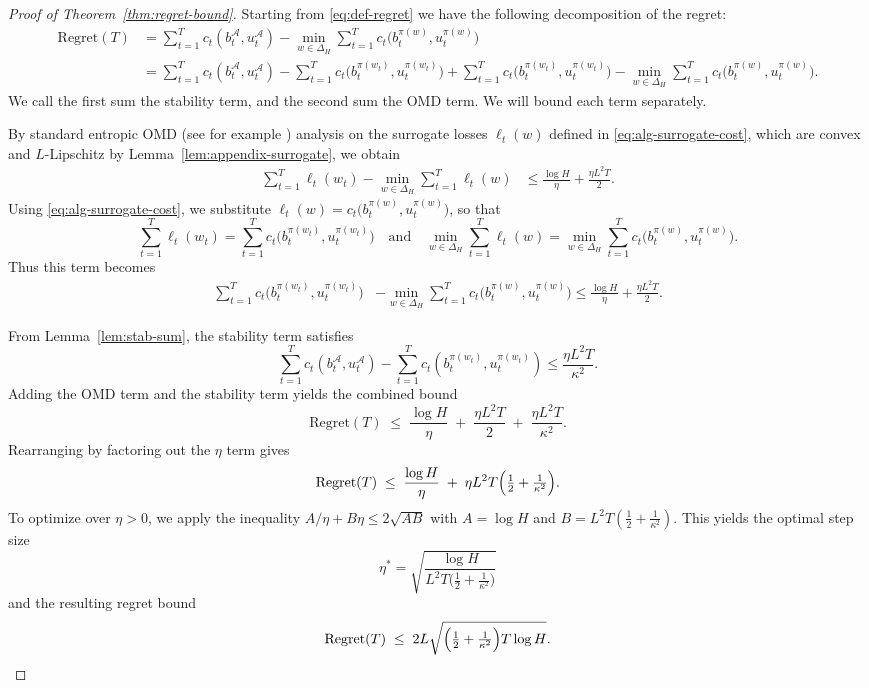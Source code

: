 \documentclass[11pt]{article}
\begin{document}
\begin{proof}[Proof of Theorem~\ref{thm:regret-bound}]

Starting from \eqref{eq:def-regret} we have the following decomposition of the regret:
\begin{align*}
\mathrm{Regret}(T)  &= \sum_{t=1}^T c_t(b_t^{\mathcal A},u_t^{\mathcal A}) - \min_{w\in\Delta_H}\sum_{t=1}^T c_t\bigl(b_t^{\pi(w)},u_t^{\pi(w)}\bigr) \\
&= \sum_{t=1}^T c_t(b_t^{\mathcal A},u_t^{\mathcal A}) - \sum_{t=1}^T c_t\bigl(b_t^{\pi(w_t)},u_t^{\pi(w_t)}\bigr) + \sum_{t=1}^T c_t\bigl(b_t^{\pi(w_t)},u_t^{\pi(w_t)}\bigr) - \min_{w\in\Delta_H}\sum_{t=1}^T c_t\bigl(b_t^{\pi(w)},u_t^{\pi(w)}\bigr).
\end{align*}
We call the first sum the stability term, and the second sum the OMD term. We will bound each term separately.

By standard entropic OMD (see for example \cite{hazan2016introduction}) analysis on the surrogate losses \(\ell_t(w)\) defined in \eqref{eq:alg-surrogate-cost}, which are convex and \(L\)-Lipschitz by Lemma~\ref{lem:appendix-surrogate}, we obtain
\begin{align*}
\sum_{t=1}^T \ell_t(w_t) - \min_{w\in\Delta_H}\sum_{t=1}^T \ell_t(w)
&\le
\frac{\log H}{\eta} + \frac{\eta L^2 T}{2}.
\end{align*}
Using \eqref{eq:alg-surrogate-cost}, we substitute \(\ell_t(w)=c_t\bigl(b_t^{\pi(w)},u_t^{\pi(w)}\bigr)\), so that
\[
\sum_{t=1}^T \ell_t(w_t)
=
\sum_{t=1}^T c_t\bigl(b_t^{\pi(w_t)},u_t^{\pi(w_t)}\bigr)
\quad\text{and}\quad
\min_{w\in\Delta_H}\sum_{t=1}^T \ell_t(w)
=
\min_{w\in\Delta_H}\sum_{t=1}^T c_t\bigl(b_t^{\pi(w)},u_t^{\pi(w)}\bigr).
\]
Thus this term becomes
\begin{align*}
\sum_{t=1}^T c_t\bigl(b_t^{\pi(w_t)},u_t^{\pi(w_t)}\bigr)
&-
\min_{w\in\Delta_H}\sum_{t=1}^T c_t\bigl(b_t^{\pi(w)},u_t^{\pi(w)}\bigr)
\le
\frac{\log H}{\eta} + \frac{\eta L^2 T}{2}.
\end{align*}


From Lemma~\ref{lem:stab-sum}, the stability term satisfies
\[
\sum_{t=1}^T c_t(b_t^{\mathcal A},u_t^{\mathcal A})- \sum_{t=1}^T c_t(b_t^{\pi(w_t)},u_t^{\pi(w_t)}) 
\le 
\frac{\eta L^2 T}{\kappa^2}.
\]
Adding the OMD term and the stability term yields the combined bound
\[
\mathrm{Regret}(T)
\;\le\;
\frac{\log H}{\eta}
\;+\;
\frac{\eta L^2 T}{2}
\;+\;
\frac{\eta L^2 T}{\kappa^2}.
\]
Rearranging by factoring out the \(\eta\) term gives
\[
\mathrm{Regret}(T)
\;\le\;
\frac{\log H}{\eta}
\;+\;
\eta L^2 T\Bigl(\tfrac{1}{2}+\tfrac{1}{\kappa^2}\Bigr).
\]
To optimize over \(\eta > 0\), we apply the inequality \(A/\eta + B\eta \le 2\sqrt{AB}\) with \(A=\log H\) and \(B= L^2 T(\tfrac{1}{2}+\tfrac{1}{\kappa^2})\). This yields the optimal step size
\[
\eta^* = \sqrt{\frac{\log H}{L^2 T\bigl(\tfrac{1}{2}+\tfrac{1}{\kappa^2}\bigr)}}
\]
and the resulting regret bound
\[
\mathrm{Regret}(T) \;\le\; 2L\sqrt{\Bigl(\tfrac{1}{2}+\tfrac{1}{\kappa^2}\Bigr)T\log H}.
\]
\end{proof}





\end{document}
